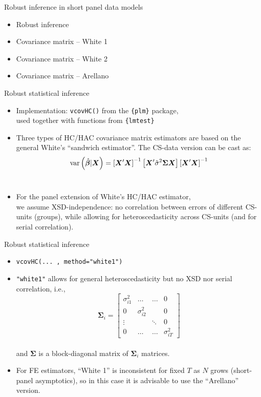 \documentclass[usenames,dvipsnames]{beamer}
\begin{document}
\begin{frame}{Robust inference in short panel data models}
\begin{itemize}
    \item Robust inference
    \bigskip
    \item Covariance matrix -- White 1 
    \bigskip
    \item Covariance matrix -- White 2
    \bigskip
    \item Covariance matrix -- Arellano
\end{itemize}
\end{frame}
\begin{frame}{Robust statistical inference}
\begin{itemize}
    \item Implementation: \texttt{vcovHC()} from the \texttt{\{plm\}} package, 
    \\used together with functions from \texttt{\{lmtest\}}
    \medskip
    \item Three types of HC/HAC covariance matrix estimators are based on the general White's ``sandwich estimator''. The CS-data version can be cast as:\\
    \medskip
    $$\textnormal{var} \left(\hat{\bm{\beta}}|\bm{X}\right)= 
    \left[ \bm{X}^{\prime} \bm{X} \right]^{-1}
    \left[ \bm{X}^{\prime} \hat{\sigma}^2 \bm{\Sigma} \bm{X} \right]
    \left[ \bm{X}^{\prime} \bm{X} \right]^{-1}$$ \\ \medskip
     \medskip
    \item For the panel extension of White's HC/HAC estimator, \\we assume XSD-independence: no correlation between errors of different CS-units (groups), while allowing for heteroscedasticity across CS-units (and for serial correlation).
\end{itemize}
\end{frame}
\begin{frame}{Robust statistical inference}
\begin{itemize}
    \item \texttt{vcovHC(... , method="white1")}
    \medskip
    \item \texttt{"white1"} allows for general heteroscedasticity but no XSD nor serial correlation, i.e.,\\
    $$
    \bm{\Sigma}_i =
    \begin{bmatrix}
    \sigma_{i1}^2 & \dots & \dots & 0 \\
    0 & \sigma_{i2}^2 &  & 0 \\
    \vdots & & \ddots & 0 \\
    0 & \dots & \dots & \sigma_{iT}^2
    \end{bmatrix}
    $$\\
    and $\bm{\Sigma}$ is a block-diagonal matrix of $\bm{\Sigma}_i$ matrices.
    \smallskip
    \medskip
    \item For FE estimators, ``White 1'' is inconsistent for fixed $T$ as $N$ grows (short-panel asymptotics), so in this case it is advisable to use the ``Arellano'' version.
\end{itemize}
\end{frame}
\end{document}
